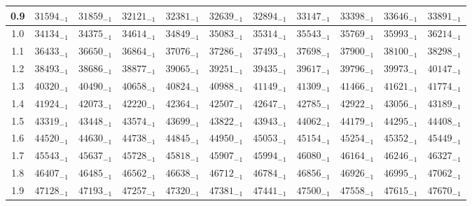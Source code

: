 \documentclass[10pt, a4paper]{article}
\begin{document}
\begin{center}
\begin{longtable}{c || c c c c c | c c c c c}
        0.9 & \({31594}_{-1}\) & \({31859}_{-1}\) & \({32121}_{-1}\) & \({32381}_{-1}\) & \({32639}_{-1}\) & \({32894}_{-1}\) & \({33147}_{-1}\) & \({33398}_{-1}\) & \({33646}_{-1}\) & \({33891}_{-1}\)\\
        \hline
        1.0 & \({34134}_{-1}\) & \({34375}_{-1}\) & \({34614}_{-1}\) & \({34849}_{-1}\) & \({35083}_{-1}\) & \({35314}_{-1}\) & \({35543}_{-1}\) & \({35769}_{-1}\) & \({35993}_{-1}\) & \({36214}_{-1}\)\\
        1.1 & \({36433}_{-1}\) & \({36650}_{-1}\) & \({36864}_{-1}\) & \({37076}_{-1}\) & \({37286}_{-1}\) & \({37493}_{-1}\) & \({37698}_{-1}\) & \({37900}_{-1}\) & \({38100}_{-1}\) & \({38298}_{-1}\)\\
        1.2 & \({38493}_{-1}\) & \({38686}_{-1}\) & \({38877}_{-1}\) & \({39065}_{-1}\) & \({39251}_{-1}\) & \({39435}_{-1}\) & \({39617}_{-1}\) & \({39796}_{-1}\) & \({39973}_{-1}\) & \({40147}_{-1}\)\\
        1.3 & \({40320}_{-1}\) & \({40490}_{-1}\) & \({40658}_{-1}\) & \({40824}_{-1}\) & \({40988}_{-1}\) & \({41149}_{-1}\) & \({41309}_{-1}\) & \({41466}_{-1}\) & \({41621}_{-1}\) & \({41774}_{-1}\)\\
        1.4 & \({41924}_{-1}\) & \({42073}_{-1}\) & \({42220}_{-1}\) & \({42364}_{-1}\) & \({42507}_{-1}\) & \({42647}_{-1}\) & \({42785}_{-1}\) & \({42922}_{-1}\) & \({43056}_{-1}\) & \({43189}_{-1}\)\\
        1.5 & \({43319}_{-1}\) & \({43448}_{-1}\) & \({43574}_{-1}\) & \({43699}_{-1}\) & \({43822}_{-1}\) & \({43943}_{-1}\) & \({44062}_{-1}\) & \({44179}_{-1}\) & \({44295}_{-1}\) & \({44408}_{-1}\)\\
        1.6 & \({44520}_{-1}\) & \({44630}_{-1}\) & \({44738}_{-1}\) & \({44845}_{-1}\) & \({44950}_{-1}\) & \({45053}_{-1}\) & \({45154}_{-1}\) & \({45254}_{-1}\) & \({45352}_{-1}\) & \({45449}_{-1}\)\\
        1.7 & \({45543}_{-1}\) & \({45637}_{-1}\) & \({45728}_{-1}\) & \({45818}_{-1}\) & \({45907}_{-1}\) & \({45994}_{-1}\) & \({46080}_{-1}\) & \({46164}_{-1}\) & \({46246}_{-1}\) & \({46327}_{-1}\)\\
        1.8 & \({46407}_{-1}\) & \({46485}_{-1}\) & \({46562}_{-1}\) & \({46638}_{-1}\) & \({46712}_{-1}\) & \({46784}_{-1}\) & \({46856}_{-1}\) & \({46926}_{-1}\) & \({46995}_{-1}\) & \({47062}_{-1}\)\\
        1.9 & \({47128}_{-1}\) & \({47193}_{-1}\) & \({47257}_{-1}\) & \({47320}_{-1}\) & \({47381}_{-1}\) & \({47441}_{-1}\) & \({47500}_{-1}\) & \({47558}_{-1}\) & \({47615}_{-1}\) & \({47670}_{-1}\)\\

\end{longtable}
\end{center}
\end{document}

